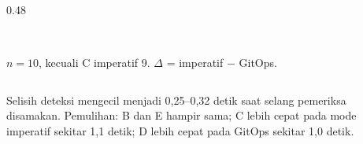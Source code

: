 {\begin{frame}
\begin{columns}[T]
\begin{column}{0.48\textwidth}
\begin{tabular}{@{}lrrr@{}}
                \bottomrule
            \end{tabular}\\[2pt]
            {\tiny $n=10$, kecuali C imperatif 9. $\Delta$ = imperatif $-$ GitOps.}
        \end{column}
    \end{columns}
    \vspace{0.04cm}
    \raggedright\scriptsize
    Selisih deteksi mengecil menjadi 0,25--0,32 detik saat selang pemeriksa disamakan. Pemulihan: B dan E hampir sama; C lebih cepat pada mode imperatif sekitar 1,1 detik; D lebih cepat pada GitOps sekitar 1,0 detik.
    \vspace{0.04cm}
    \vspace{0.02cm}
\end{frame}
}

